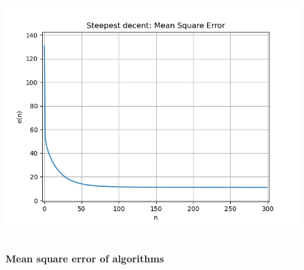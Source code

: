 \documentclass[a4paper,12pt,oneside,titlepage]{article}
\begin{document}
\begin{figure}[H]
\begin{center}
	 		{\includegraphics[width=.5\textwidth]{SteepestdecentMeanSquareError.PNG}}\\
	 		\\
	 		\caption{\textbf{Mean square error of algorithms}}
	 		\label{fig:err}
	 	\end{center}
	 \end{figure}
	
	
	
\end{document}

